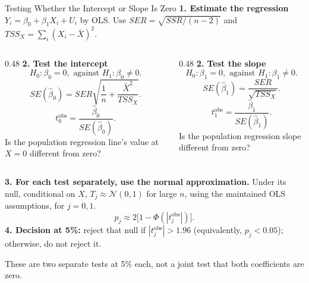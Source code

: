 \documentclass[notes,10pt, aspectratio=169]{beamer}
\begin{document}
\begin{frame}{Testing Whether the Intercept or Slope Is Zero}
\footnotesize
\setlength{\abovedisplayskip}{3pt}
\setlength{\belowdisplayskip}{3pt}
\textbf{1. Estimate the regression} $Y_i=\beta_0+\beta_1X_i+U_i$ by OLS.
Use $SER=\sqrt{SSR/(n-2)}$ and $TSS_X=\sum_i(X_i-\bar X)^2$.
\par\smallskip
\begin{columns}[T]
\begin{column}{0.48\textwidth}
\textbf{2. Test the intercept}
\[
H_0:\beta_0=0,\text{ against }H_1:\beta_0\ne0.
\]
\[
SE(\hat\beta_0)=SER\sqrt{\frac1n+\frac{\bar X^2}{TSS_X}}.
\]
\[
t_0^{\mathrm{obs}}=\frac{\hat\beta_0}{SE(\hat\beta_0)}.
\]
Is the population regression line's value at $X=0$ different from zero?
\end{column}
\begin{column}{0.48\textwidth}
\textbf{2. Test the slope}
\[
H_0:\beta_1=0,\text{ against }H_1:\beta_1\ne0.
\]
\[
SE(\hat\beta_1)=\frac{SER}{\sqrt{TSS_X}}.
\]
\[
t_1^{\mathrm{obs}}=\frac{\hat\beta_1}{SE(\hat\beta_1)}.
\]
Is the population regression slope different from zero?
\end{column}
\end{columns}
\par\smallskip
\textbf{3. For each test separately, use the normal approximation.}
Under its null, conditional on $X$, $T_j\approx\mathcal{N}(0,1)$ for large $n$,
using the maintained OLS assumptions, for $j=0,1$.
\[
p_j\approx2\bigl[1-\Phi(|t_j^{\mathrm{obs}}|)\bigr].
\]
\textbf{4. Decision at 5\%:} reject that null if $|t_j^{\mathrm{obs}}|>1.96$
(equivalently, $p_j<0.05$); otherwise, do not reject it.
\par\smallskip
These are two separate tests at 5\% each, not a joint test that both coefficients are zero.
\end{frame}
\end{document}

